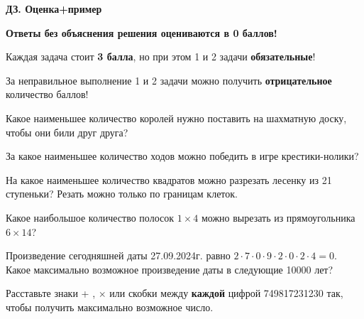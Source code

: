 \centerline{\bf \Huge ДЗ. Оценка+пример}
\centerline{\bf \Huge }

\begin{flushright}
        \scriptsize{\textbf{Ответы без объяснения решения оцениваются в 0 баллов!}}
\end{flushright}

Каждая задача стоит \textbf{3 балла}, но при этом 1 и 2 задачи \textbf{обязательные}! 

За неправильное выполнение 1 и 2 задачи можно получить \textbf{отрицательное} количество баллов!

 Какое наименьшее количество королей нужно поставить на шахматную доску, чтобы они били друг друга?

 За какое наименьшее количество ходов можно победить в игре крестики-нолики?

 На какое наименьшее количество квадратов можно разрезать лесенку из 21 ступеньки? Резать можно только по границам клеток.

 Какое наибольшое количество полосок $1 \times 4$ можно вырезать из прямоугольника $6 \times 14$?

 Произведение сегодняшней даты 27.09.2024г. равно $2\cdot7\cdot0\cdot9\cdot2\cdot0\cdot2\cdot4=0$. Какое максимально возможное произведение даты в следующие 10000 лет?

 Расставьте знаки + , $\times$ или скобки между \textbf{каждой} цифрой 749817231230 так, чтобы получить максимально возможное число.


